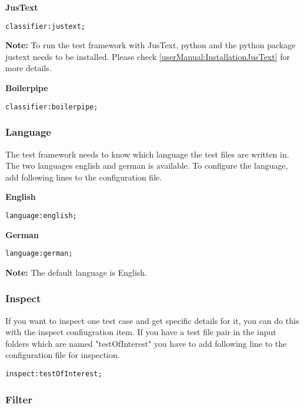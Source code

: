 \textbf{JusText}

\begin{lstlisting}
classifier:justext;
\end{lstlisting}

\textbf{Note:} To run the test framework with JusText, python and the python package justext needs to be installed. Please check \ref{userManual:InstallationJusText} for more details.


\textbf{Boilerpipe}

\begin{lstlisting}
classifier:boilerpipe;
\end{lstlisting}


\subsubsection{Language}

The test framework needs to know which language the test files are written in. The two languages english and german is available. To configure the language, add following lines to the configuration file.

\textbf{English}
\begin{lstlisting}
language:english;
\end{lstlisting}

\textbf{German}
\begin{lstlisting}
language:german;
\end{lstlisting}

\textbf{Note:} The default language is English.

\subsubsection{Inspect}
\label{usermanual:inspect}

If you want to inspect one test case and get specific details for it, you can do this with the inspect confiugration item.
If you have a test file pair in the input folders which are named "testOfInterest" you have to add following line to the configuration file for inspection.

\begin{lstlisting}
inspect:testOfInterest;
\end{lstlisting}


\subsubsection{Filter}

